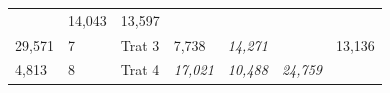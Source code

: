 \documentclass[]{book}
\theoremstyle{definition}
\theoremstyle{definition}
\theoremstyle{definition}
\theoremstyle{remark}
\begin{document}
\begin{longtable}[]{@{}lllllll@{}}
\begin{minipage}[t]{0.07\columnwidth}
\strut
\end{minipage} & \begin{minipage}[t]{0.07\columnwidth}\raggedright
14,043\strut
\end{minipage} & \begin{minipage}[t]{0.06\columnwidth}\raggedright
13,597\strut
\end{minipage}\tabularnewline
\begin{minipage}[t]{0.44\columnwidth}\raggedright
29,571\strut
\end{minipage} & \begin{minipage}[t]{0.06\columnwidth}\raggedright
7\strut
\end{minipage} & \begin{minipage}[t]{0.06\columnwidth}\raggedright
Trat 3\strut
\end{minipage} & \begin{minipage}[t]{0.07\columnwidth}\raggedright
7,738\strut
\end{minipage} & \begin{minipage}[t]{0.07\columnwidth}\raggedright
\emph{14,271}\strut
\end{minipage} & \begin{minipage}[t]{0.07\columnwidth}\raggedright
\strut
\end{minipage} & \begin{minipage}[t]{0.06\columnwidth}\raggedright
13,136\strut
\end{minipage}\tabularnewline
\begin{minipage}[t]{0.44\columnwidth}\raggedright
4,813\strut
\end{minipage} & \begin{minipage}[t]{0.06\columnwidth}\raggedright
8\strut
\end{minipage} & \begin{minipage}[t]{0.06\columnwidth}\raggedright
Trat 4\strut
\end{minipage} & \begin{minipage}[t]{0.07\columnwidth}\raggedright
\emph{17,021}\strut
\end{minipage} & \begin{minipage}[t]{0.07\columnwidth}\raggedright
\emph{10,488}\strut
\end{minipage} & \begin{minipage}[t]{0.07\columnwidth}\raggedright
\emph{24,759}\strut
\end{minipage} & \begin{minipage}[t]{0.06\columnwidth}\raggedright
\strut
\end{minipage}\tabularnewline
\bottomrule
\end{longtable}
\end{document}
